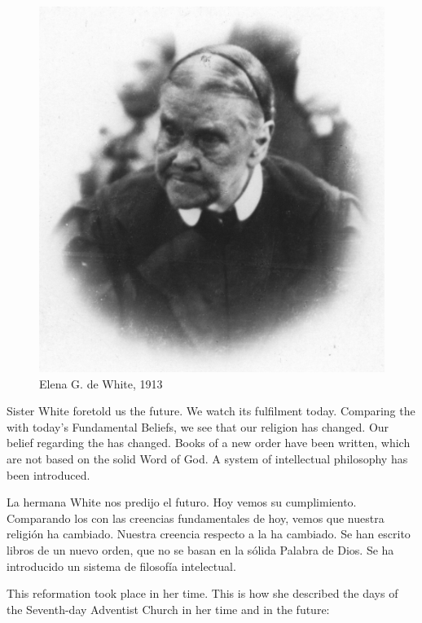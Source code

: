 \begin{figure}
    \centering
    \includegraphics[width=1\linewidth]{images/ellen-white-1913.jpg}
    \caption*{Elena G. de White, 1913}
    \label{fig:e-white-1913}
\end{figure}


Sister White foretold us the future. We watch its fulfilment today. Comparing the  with today’s Fundamental Beliefs, we see that our religion has changed. Our belief regarding the  has changed. Books of a new order have been written, which are not based on the solid Word of God. A system of intellectual philosophy has been introduced.


La hermana White nos predijo el futuro. Hoy vemos su cumplimiento. Comparando los  con las creencias fundamentales de hoy, vemos que nuestra religión ha cambiado. Nuestra creencia respecto a la  ha cambiado. Se han escrito libros de un nuevo orden, que no se basan en la sólida Palabra de Dios. Se ha introducido un sistema de filosofía intelectual.


This reformation took place in her time. This is how she described the days of the Seventh-day Adventist Church in her time and in the future:


